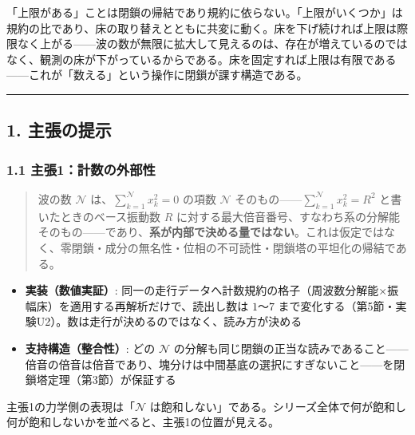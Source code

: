 \documentclass[
  a4paper,
]{ltjsarticle}
\providecommand{\tightlist}{%
  \setlength{\itemsep}{0pt}\setlength{\parskip}{0pt}}
\begin{document}
「上限がある」ことは閉鎖の帰結であり規約に依らない。「上限がいくつか」は規約の比であり、床の取り替えとともに共変に動く。床を下げ続ければ上限は際限なく上がる------波の数が無限に拡大して見えるのは、存在が増えているのではなく、観測の床が下がっているからである。床を固定すれば上限は有限である------これが「数える」という操作に閉鎖が課す構造である。

\begin{center}\rule{0.5\linewidth}{0.5pt}\end{center}

\subsection{1. 主張の提示}\label{ux4e3bux5f35ux306eux63d0ux793a}

\subsubsection{1.1
主張1：計数の外部性}\label{ux4e3bux5f351ux8a08ux6570ux306eux5916ux90e8ux6027}

\begin{quote}
波の数 \(\mathcal N\) は、\(\sum_{k=1}^{\mathcal N} x_k^2=0\) の項数
\(\mathcal N\) そのもの------\(\sum_{k=1}^{\mathcal N} x_k^2=R^2\)
と書いたときのベース振動数 \(R\)
に対する最大倍音番号、すなわち系の分解能そのもの------であり、\textbf{系が内部で決める量ではない}。これは仮定ではなく、零閉鎖・成分の無名性・位相の不可読性・閉鎖塔の平坦化の帰結である。
\end{quote}

\begin{itemize}
\tightlist
\item
  \textbf{実装（数値実証）}:
  同一の走行データへ計数規約の格子（周波数分解能×振幅床）を適用する再解析だけで、読出し数は
  \(1\)〜\(7\)
  まで変化する（第5節・実験U2）。数は走行が決めるのではなく、読み方が決める
\item
  \textbf{支持構造（整合性）}: どの \(\mathcal N\)
  の分解も同じ閉鎖の正当な読みであること------倍音の倍音は倍音であり、塊分けは中間基底の選択にすぎないこと------を閉鎖塔定理（第3節）が保証する
\end{itemize}

主張1の力学側の表現は「\(\mathcal N\)
は飽和しない」である。シリーズ全体で何が飽和し何が飽和しないかを並べると、主張1の位置が見える。
\end{document}
